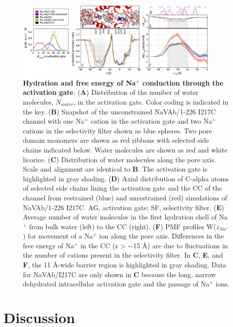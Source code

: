 \begin{refsection}
{\begin{figure}[hp]
\centering
\includegraphics[width=0.9\textwidth]{navopen/NavOFig10}
\caption[Hydration and free energy of Na$^+$ conduction through the activation gate]{\textbf{Hydration and free energy of Na$^+$ conduction through the activation gate}. (\textbf{A}) Distribution of the number of water molecules, $N_{water}$, in the activation gate. Color coding is indicated in the key. (\textbf{B}) Snapshot of the unconstrained NaVAb/1-226 I217C channel with one Na$^+$ cation in the activation gate and two Na$^+$ cations in the selectivity filter shown as blue spheres. Two pore domain monomers are shown as red ribbons with selected side chains indicated below. Water molecules are shown as red and white licorice. (\textbf{C}) Distribution of water molecules along the pore axis. Scale and alignment are identical to \textbf{B}. The activation gate is highlighted in gray shading. (\textbf{D}) Axial distribution of C-alpha atoms of selected side chains lining the activation gate and the CC of the channel from restrained (blue) and unrestrained (red) simulations of NaVAb/1-226 I217C. AG, activation gate; SF, selectivity filter. (\textbf{E}) Average number of water molecules in the first hydration shell of Na$^+$ from bulk water (left) to the CC (right). (\textbf{F}) PMF profiles W($z_{Na^{+}}$) for movement of a Na$^+$ ion along the pore axis. Differences in the free energy of Na$^+$ in the CC (z > $\sim$15 \AA) are due to fluctuations in the number of cations present in the selectivity filter. In \textbf{C}, \textbf{E}, and \textbf{F}, the 11 \AA-wide barrier region is highlighted in gray shading. Data for NaVAb/I217C are only shown in \textbf{C} because the long, narrow dehydrated intracellular activation gate and the passage of Na$^+$ ions.}
\label{fig:navofig10}
\end{figure}

\section{Discussion} 

}
\end{refsection}
